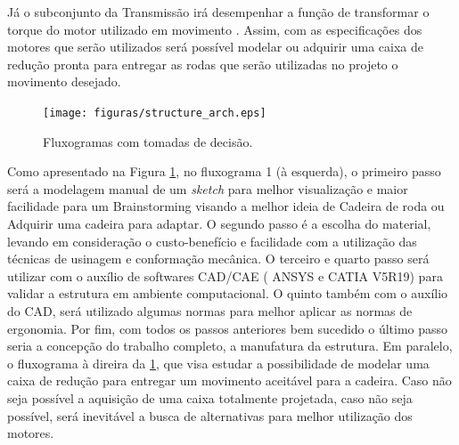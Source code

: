 Já o subconjunto da Transmissão irá desempenhar a função de 
transformar o torque do motor utilizado em movimento \cite{cardoso}. 
Assim, com as especificações dos motores que serão utilizados 
será possível modelar ou adquirir uma caixa de redução pronta para 
entregar as rodas que serão utilizadas no projeto o movimento desejado.

\begin{figure}[H]
  \centering
    \texttt{[image: figuras/structure\_arch.eps]}
  \caption{Fluxogramas com tomadas de decisão.}
  \label{fig:structure_arch}
\end{figure}

Como apresentado na Figura \ref{fig:structure_arch}, no fluxograma 1 (à esquerda), o primeiro passo 
será a modelagem manual de um \textit{sketch} para melhor visualização 
e maior facilidade para um Brainstorming visando a melhor ideia 
de Cadeira de roda ou Adquirir uma cadeira para adaptar. 
O segundo passo é a escolha do material, levando em consideração 
o custo-benefício e facilidade com a utilização das técnicas de 
usinagem e conformação mecânica. O terceiro e quarto passo será 
utilizar com o auxílio de softwares CAD/CAE ( ANSYS e CATIA V5R19) 
para validar a estrutura em ambiente computacional. O quinto também 
com o auxílio do CAD, será utilizado algumas normas para melhor 
aplicar as normas de ergonomia. Por fim, com todos os passos anteriores bem sucedido o último passo seria a concepção do 
trabalho completo, a manufatura da estrutura. Em paralelo, o fluxograma à direira da \ref{fig:structure_arch}, 
que visa estudar a possibilidade de modelar uma caixa de redução 
para entregar um movimento aceitável para a cadeira. Caso não seja 
possível a 
aquisição de uma caixa totalmente projetada, caso não seja possível, 
será inevitável a busca de alternativas para melhor utilização dos motores.

